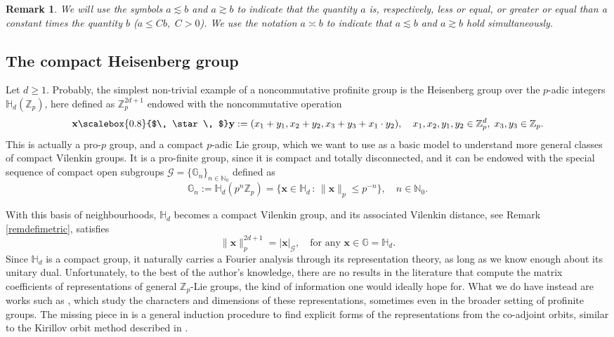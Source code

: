 \documentclass[12pt, reqno]{amsart}
\newtheorem{rem}[defi]{Remark}
\newcommand{\Z}{\mathbb{Z}}
\newcommand{\1}{\mathds{1}}
\newcommand{\G}{\mathbb{G}}
\newcommand{\smallstar}{\scalebox{0.8}{$\, \star \, $}}
\begin{document}
\begin{rem}\label{remnotationinequalities}
We will use the symbols $a \lesssim b$ and $a \gtrsim b$ to indicate that the quantity $a$ is, respectively, less or equal, or greater or equal than a constant times the quantity $b$ ($a \leq C b, \,\, C> 0$). We use the notation $a \asymp b$ to indicate that $a \lesssim b$ and $a \gtrsim b$ hold simultaneously.
\end{rem}

\subsection{The compact Heisenberg group}
Let $d \geq 1$. Probably, the simplest non-trivial example of a noncommutative profinite group is the Heisenberg group over the $p$-adic integers $\mathbb{H}_d(\Z_p)$, here defined as $\mathbb{Z}_p^{2d+1}$ endowed with the noncommutative operation
\[
\mathbf{x} \smallstar \mathbf{y} := (x_1 + y_1, x_2 + y_2, x_3 + y_3 + x_1 \cdot y_2), \quad x_1, x_2, y_1, y_2 \in \mathbb{Z}_p^d, \; x_3, y_3 \in \mathbb{Z}_p.
\]
This is actually a pro-$p$ group, and a compact $p$-adic Lie group, which we want to use as a basic model to understand more general classes of compact Vilenkin groups. It is a pro-finite group, since it is compact and totally disconnected, and it can be endowed with the special sequence of compact open subgroups $\mathcal{G} = \{\G_n\}_{n \in \mathbb{N}_0}$ defined as
\[
\G_n := \mathbb{H}_d(p^n \mathbb{Z}_p)= \{ \mathbf{x} \in \mathbb{H}_d \, : \, \| \mathbf{x} \|_p \leq p^{-n}  \} , \quad n \in \mathbb{N}_0.
\]

With this basis of neighbourhoods, $\mathbb{H}_d$ becomes a compact Vilenkin group, and its associated Vilenkin distance, see Remark \ref{remdefimetric}, satisfies
\[
\|\mathbf{x}\|_{p}^{2d+1} = |\mathbf{x}|_{\mathcal{G}}, \quad \text{for any } \mathbf{x} \in \mathbb{G}= \mathbb{H}_d.
\]
Since $\mathbb{H}_d$ is a compact group, it naturally carries a Fourier analysis through its representation theory, as long as we know enough about its unitary dual. Unfortunately, to the best of the author’s knowledge, there are no results in the literature that compute the matrix coefficients of representations of general $\Z_p$-Lie groups, the kind of information one would ideally hope for. What we do have instead are works such as \cite{Boyarchenko2008, Howe1977}, which study the characters and dimensions of these representations, sometimes even in the broader setting of profinite groups. The missing piece in \cite{Boyarchenko2008, Howe1977} is a general induction procedure to find explicit forms of the representations from the co-adjoint orbits, similar to the Kirillov orbit method described in \cite{Corwin2004-kz}.
\end{document}

